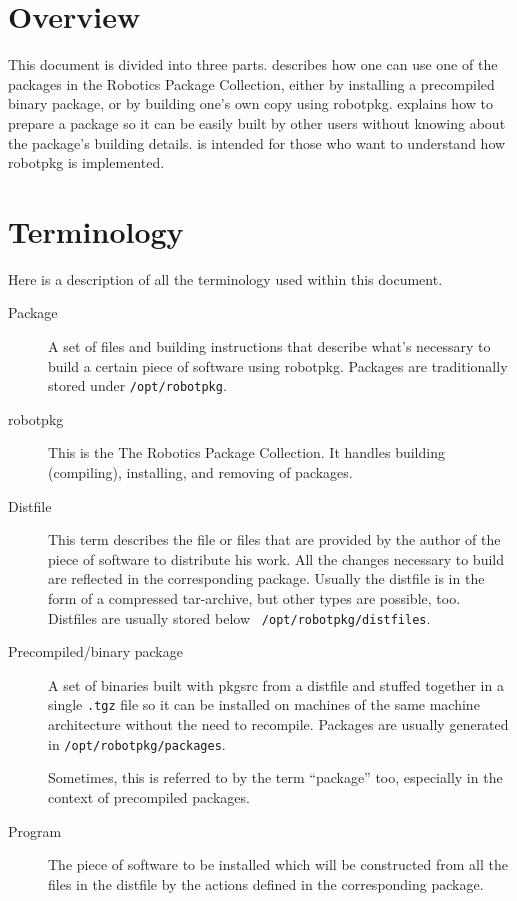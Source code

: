 \section{Overview} %

This document is divided  into three parts.  
describes how  one  can  use  one of   the  packages  in the  Robotics  Package
Collection, either  by installing a precompiled binary  package, or by building
one's own  copy  using  robotpkg.   
explains how  to prepare a package so  it can be  easily  built by  other users
without     knowing     about     the     package's    building        details.
 is  intended for  those   who want to
understand how robotpkg is implemented.


\section{Terminology} %

Here is a description of all the terminology used within this document.

\begin{description}
   \item[Package] A set of files and building instructions that describe what's
   necessary to build a certain piece  of software using robotpkg. Packages are
   traditionally stored under {\tt /opt/robotpkg}.

   \item[robotpkg]  This is  the The Robotics   Package Collection.  It handles
   building (compiling), installing, and removing of packages.

   \item[Distfile] This  term describes the file  or files that are provided by
   the author of the piece of software to distribute  his work. All the changes
   necessary to  build are reflected  in the corresponding package. Usually the
   distfile is in  the form of a  compressed  tar-archive, but other  types are
   possible,     too.    Distfiles   are      usually   stored    below    {\tt
   /opt/robotpkg/distfiles}.

   \item[Precompiled/binary package] A set of binaries built with pkgsrc from a
   distfile and  stuffed  together in a   single {\tt .tgz}  file so  it can be
   installed on machines of the  same machine architecture  without the need to
   recompile. Packages are usually generated in {\tt /opt/robotpkg/packages}.

   Sometimes, this is  referred to by the  term ``package''  too, especially in
   the context of precompiled packages.

   \item[Program]  The  piece  of  software to  be  installed  which  will   be
   constructed from all the files in the distfile by the actions defined in the
   corresponding package.

\end{description}


